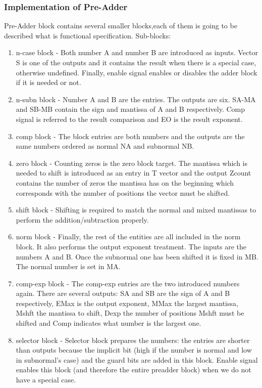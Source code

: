 \documentclass{scrreprt}
\begin{document}
\subsubsection*{Implementation of Pre-Adder}
Pre-Adder block contains several smaller blocks,each of them is going to be described what is functional specification. 
Sub-blocks:
\begin{enumerate}
    \item n-case block - Both number A and number B are introduced as inputs. Vector S is one of the outputs and it contains the result when there is a special case, otherwise undefined. Finally, enable signal enables or disables the adder block if it is needed or not.
    \item n-subn block - Number A and B are the entries. The outputs are six. SA-MA and SB-MB contain the sign and mantissa of A and B respectively. Comp signal is referred to the result comparison and EO is the result exponent. 
    \item comp block - The block entries are both numbers and the outputs are the same numbers ordered as normal NA and subnormal NB.
    \item zero block - Counting zeros is the zero block target. The mantissa which is needed to shift is introduced as an entry in T vector and the output Zcount contains the number of zeros the mantissa has on the beginning which corresponds with the number of positions the vector must be shifted.
    \item shift block - Shifting is required to match the normal and mixed mantissas to perform the addition/subtraction properly.
    \item norm block - Finally, the rest of the entities are all included in the norm block. It also performs the output exponent treatment. The inputs are the numbers A and B. Once the subnormal one has been shifted it is fixed in MB. The normal number is set in MA.
    \item comp-exp block - The comp-exp entries are the two introduced numbers again. There are several outputs: SA and SB are the sign of A and B respectively, EMax is the output exponent, MMax the largest mantissa, Mshft the mantissa to shift, Dexp the number of positions Mshft must be shifted and Comp indicates what number is the largest one.
    \item selector block - Selector block prepares the numbers: the entries are shorter than outputs because the implicit bit (high if the number is normal and low in subnormal’s case) and the guard bits are added in this block. Enable signal enables this block (and therefore the entire preadder block) when we do not have a special case. 

\end{enumerate}
\end{document}
